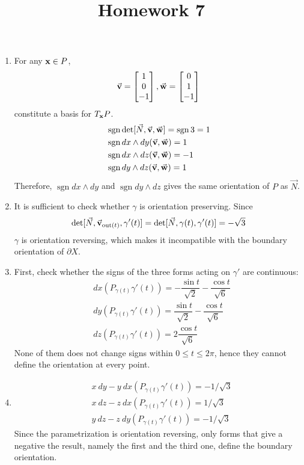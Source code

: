 \documentclass{homework}
\title{Homework 7}
\DeclareMathOperator{\sgn}{sgn}
\begin{document}
\maketitle

\begin{problem}{1}
  \begin{enumerate}
    \item
      For any $\mathbf{x} \in P$,
      $$\vec{\mathbf{v}} = \begin{bmatrix}1 \\ 0 \\ -1\end{bmatrix}, \vec{\mathbf{w}} = \begin{bmatrix}0\\ 1 \\ -1\end{bmatrix}$$
      constitute a basis for $T_{\mathbf{x}}P$.
      \begin{align*}
        &\sgn \det[\vec{N}, \bvec{v}, \bvec{w}] = \sgn 3 = 1 \\
        &\sgn dx \land dy (\bvec{v}, \bvec{w}) = 1 \\
        &\sgn dx \land dz (\bvec{v}, \bvec{w}) = -1 \\
        &\sgn dy \land dz (\bvec{v}, \bvec{w}) = 1 \\
      \end{align*}
      Therefore, $\sgn dx \land dy$ and $\sgn dy \land dz$ gives the same
      orientation of $P$ as $\vec{N}$.
    \item
      It is sufficient to check whether $\gamma$ is orientation preserving.
      Since
      $$\det[\vec{N}, \vec{\mathbf{v}}_{\mathrm{out}(t)}, \gamma'(t)] =
        \det[\vec{N}, \gamma(t), \gamma'(t)] = -\sqrt{3}$$
      $\gamma$ is orientation reversing, which makes it incompatible with the
      boundary orientation of $\partial X$.
    \item
      First, check whether the signs of the three forms acting on $\gamma'$ are
      continuous:
      \begin{align*}
        &dx(P_{\gamma(t)} \gamma'(t))
          = -\dfrac{\sin t}{\sqrt{2}} -\dfrac{\cos t}{\sqrt{6}} \\
        &dy(P_{\gamma(t)} \gamma'(t))
          =  \dfrac{\sin t}{\sqrt{2}} -\dfrac{\cos t}{\sqrt{6}} \\
        &dz(P_{\gamma(t)} \gamma'(t))
          = 2\dfrac{\cos t}{\sqrt{6}}
      \end{align*}
      None of them does not change signs within $0 \leq t \leq 2\pi$, hence they
      cannot define the orientation at every point.
    \item
    \begin{align*}
      &x\ dy - y\ dx (P_{\gamma(t)} \gamma'(t)) = -1/\sqrt{3} \\
      &x\ dz - z\ dx (P_{\gamma(t)} \gamma'(t)) =  1/\sqrt{3} \\
      &y\ dz - z\ dy (P_{\gamma(t)} \gamma'(t)) = -1/\sqrt{3}
    \end{align*}
    Since the parametrization is orientation reversing, only forms that
    give a negative the result, namely the first and the third one,
    define the boundary orientation.
  \end{enumerate}
\end{problem}
\end{document}
